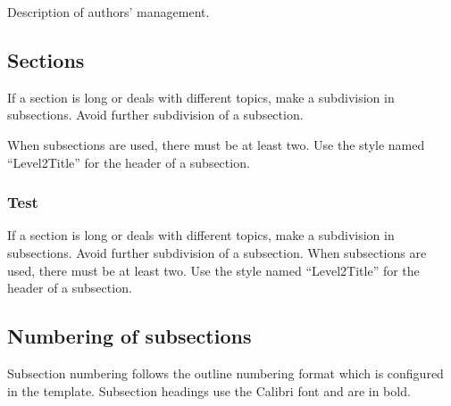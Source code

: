 \documentclass[10pt,onecolumn]{imeko_acta}
\begin{document}
Description of authors' management.

\subsection{Sections}

If a section is long or deals with different topics, make a subdivision in subsections. Avoid further subdivision of a subsection. 

When subsections are used, there must be at least two. Use the style named ``Level2Title'' for the header of a subsection.

\subsubsection{Test}
If a section is long or deals with different topics, make a subdivision in subsections. Avoid further subdivision of a subsection. When subsections are used, there must be at least two. Use the style named ``Level2Title'' for the header of a subsection.


\subsection{Numbering of subsections}

Subsection numbering follows the outline numbering format which is configured in the template. Subsection headings use the Calibri font and are in bold.




\end{document}
